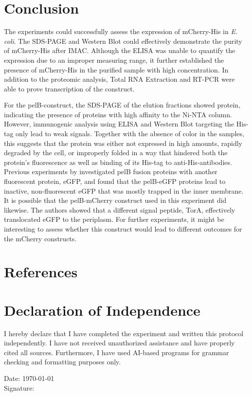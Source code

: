 \documentclass[a4paper,12pt]{article}
\begin{document}
\section{Conclusion}
The experiments could successfully assess the expression of mCherry-His in \emph{E. coli}. The SDS-PAGE and Western Blot could effectively demonstrate the purity of mCherry-His after IMAC. Although the ELISA was unable to quantify the expression due to an improper measuring range, it further established the presence of mCherry-His in the purified sample with high concentration. In addition to the proteomic analysis, Total RNA Extraction and RT-PCR were able to prove transcription of the construct. 

For the pelB-construct, the SDS-PAGE of the elution fractions showed protein, indicating the presence of proteins with high affinity to the Ni-NTA column. However, immunogenic analysis using ELISA and Western Blot targeting the His-tag only lead to weak signals. Together with the absence of color in the samples, this suggests that the protein was either not expressed in high amounts, rapidly degraded by the cell, or improperly folded in a way that hindered both the protein's fluorescence as well as binding of its His-tag to anti-His-antibodies. Previous experiments by \cite{linton2012translocation} investigated pelB fusion proteins with another fluorescent protein, eGFP, and found that the pelB-eGFP proteins lead to inactive, non-fluorescent eGFP that was mostly trapped in the inner membrane. It is possible that the pelB-mCherry construct used in this experiment did likewise. The authors showed that a different signal peptide, TorA, effectively translocated eGFP to the periplasm. For further experiments, it might be interesting to assess whether this construct would lead to different outcomes for the mCherry constructs.


\section{References}
\printbibliography[heading=none]


\newpage
\section*{Declaration of Independence}
I hereby declare that I have completed the experiment and written this protocol independently. I have not received unauthorized assistance and have properly cited all sources. Furthermore, I have used AI-based programs for grammar checking and formatting purposes only.

Date: \today \\
Signature: \underline{\hspace{5cm}}
\end{document}
